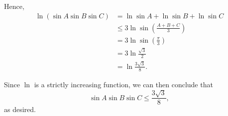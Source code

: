 \begin{enumerate}
          Hence,
          \begin{align*}
              \ln (\sin A \sin B \sin C) & = \ln \sin A + \ln \sin B + \ln \sin C           \\
                                         & \leq 3 \ln \sin \left(\frac{A + B + C}{3}\right) \\
                                         & = 3 \ln \sin \left(\frac{\pi}{3}\right)          \\
                                         & = 3 \ln \frac{\sqrt{3}}{2}                       \\
                                         & = \ln \frac{3 \sqrt{3}}{8}.
          \end{align*}

          Since \(\ln\) is a strictly increasing function, we can then conclude that
          \[
              \sin A \sin B \sin C \leq \frac{3\sqrt{3}}{8},
          \]
          as desired.
\end{enumerate}